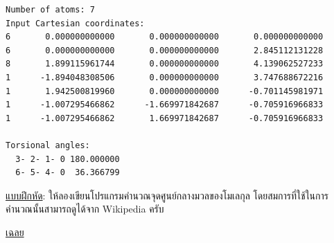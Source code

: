 \vspace{5pt}

\begin{lstlisting}[style=MyC++]
Number of atoms: 7
Input Cartesian coordinates:
6       0.000000000000       0.000000000000       0.000000000000
6       0.000000000000       0.000000000000       2.845112131228
8       1.899115961744       0.000000000000       4.139062527233
1      -1.894048308506       0.000000000000       3.747688672216
1       1.942500819960       0.000000000000      -0.701145981971
1      -1.007295466862      -1.669971842687      -0.705916966833
1      -1.007295466862       1.669971842687      -0.705916966833

Torsional angles:
  3- 2- 1- 0 180.000000
  6- 5- 4- 0  36.366799  
\end{lstlisting}

\vspace{5pt}

\noindent {}

\noindent \underline{แบบฝึกหัด}: ให้ลองเขียนโปรแกรมคำนวณจุดศูนย์กลางมวลของโมเลกุล โดยสมการที่ใช้ในการคำนวณนั้นสามารถดูได้จาก
Wikipedia ครับ

\noindent \underline{เฉลย}

\vspace{5pt}

